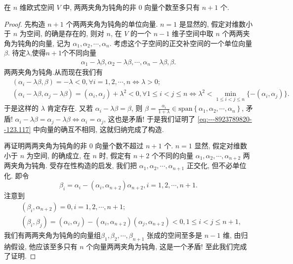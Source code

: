 \documentclass[../../main.tex]{subfiles}%
\begin{document}
\begin{example}
在 \( n \) 维欧式空间 \( V \) 中, 两两夹角为钝角的非 0 向量个数至多只有 \( n+1 \) 个.
\end{example}
\begin{proof}

先构造 \( n+1 \) 个两两夹角为钝角的单位向量. \( n=1 \) 是显然的, 假定对维数小于 \( n \) 为空间, 的确是存在的, 则对 \( n \), 在 \( V \) 的一个 \( n-1 \) 维子空间中取 \( n \) 个两两夹角为钝角的向量, 记为 \( \alpha_1, \alpha_2, \cdots, \alpha_n \). 考虑这个子空间的正交补空间的一个单位向量 \( \beta \). 待定$\lambda$,使得$n+1$个不同向量
\begin{align}
\alpha_1 - \lambda\beta, \alpha_2 - \lambda\beta, \cdots, \alpha_n - \lambda\beta, \beta. \label{eq:---8923789820--123.117}
\end{align}
两两夹角为钝角.从而现在我们有
\[
\begin{aligned}
&(\alpha_i - \lambda\beta, \beta) = -\lambda < 0, \forall i = 1, 2, \cdots, n \Leftrightarrow \lambda > 0; \\
&(\alpha_i - \lambda\beta, \alpha_j - \lambda\beta) = (\alpha_i, \alpha_j) + \lambda^2 < 0, \forall 1 \leqslant i < j \leqslant n \Leftrightarrow \lambda^2 < \min_{1 \leqslant i < j \leqslant n} \{ -(\alpha_i, \alpha_j) \}.
\end{aligned}
\]
于是这样的 \( \lambda \) 肯定存在. 又若 \( \alpha_i - \lambda\beta = \beta \), 则 \( \beta = \frac{\alpha_i}{1+\lambda} \in \mathrm{span}\left\{ \alpha _1,\alpha _2,\cdots ,\alpha _n \right\} \), 矛盾! \( \alpha_i - \lambda\beta = \alpha_j - \lambda\beta \Leftrightarrow \alpha_i = \alpha_j \), 这也是矛盾! 于是我们证明了 \eqref{eq:---8923789820--123.117} 中向量的确互不相同, 这就归纳完成了构造.

再证明两两夹角为钝角的非 0 向量个数不超过 \( n+1 \) 个. \( n=1 \) 显然, 假定对维数小于 \( n \) 为空间, 的确成立, 在 \( n \) 时, 假定有 \( n+2 \) 个不同的向量 \( \alpha_1, \alpha_2, \cdots, \alpha_{n+2} \) 两两夹角为钝角. 受存在性构造的启发, 我们把 \( \alpha_1, \alpha_2, \cdots, \alpha_{n+1} \) 正交化, 但不必单位化. 即令
\[
\beta_i = \alpha_i - (\alpha_i, \alpha_{n+2}) \alpha_{n+2}, i = 1, 2, \cdots, n+1.
\]
注意到
\[
\begin{aligned}
&(\beta_i, \alpha_{n+2}) = 0, i = 1, 2, \cdots, n+1; \\
&(\beta_i, \beta_j) = (\alpha_i, \alpha_j) - (\alpha_i, \alpha_{n+2})(\alpha_j, \alpha_{n+2}) < 0, 1 \leqslant i < j \leqslant n+1,
\end{aligned}
\]
我们有两两夹角为钝角的向量组\( \beta_1, \beta_2, \cdots, \beta_{n+1} \) 张成的空间至多是 \( n-1 \) 维, 由归纳假设, 他应该至多只有 \( n \) 个向量两两夹角为钝角, 这是一个矛盾! 至此我们完成了证明.

\end{proof}
\end{document}
